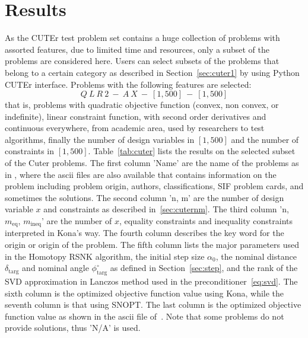 \section{Results}
As the CUTEr test problem set contains a huge collection of problems with assorted features, due to limited time and resources, only a subset of the problems are considered here. Users can select subsets of the problems that belong to a certain category as described in Section~\ref{sec:cuter1} by using Python CUTEr interface. Problems with the following features are selected:
\begin{equation*}
Q \ L \ R \ 2 \ - \ A \ X \ - \ [1,500] \ - \ [1,500]
\end{equation*}
that is, problems with quadratic objective function (convex, non convex, or indefinite), linear constraint function, with second order derivatives and continuous everywhere, from academic area, used by researchers to test algorithms, finally the number of design variables in $[1,500]$ and the number of constraints in $[1,500]$.  Table~\ref{tab:cuter} lists the results on the selected subset of the Cuter problems. The first column 'Name'  are the name of the problems as in \cite{cuter_probs}, where the ascii files are also available that contains information on the problem including problem origin, authors, classifications, SIF problem cards, and sometimes the solutions. The second column 'n, m' are the number of design variable $x$ and constraints as described in~\ref{sec:cuternm}. The third column 'n,  $m_{\text{eq}}$,  $m_{\text{ineq}}$' are the number of $x$, equality constraints and inequality constraints interpreted in Kona's way. The fourth column describes the key word for the origin or origin of the problem. The fifth column lists the major parameters used in the Homotopy RSNK algorithm, the initial step size $\textbf{$\alpha_0$}$, the nominal distance  $\delta_{\text{targ}}$  and nominal angle $\phi^{\circ}_{\text{targ}}$ as defined in Section~\ref{sec:step}, and the rank of the SVD approximation in Lanczos method used in the preconditioner~\ref{eq:svd}. The sixth column is the optimized objective function value using Kona, while the seventh column is that using SNOPT. The last column is the optimized objective function value as shown in the ascii file of~\cite{cuter_probs}. Note that some problems do not provide solutions, thus 'N/A' is used. 

